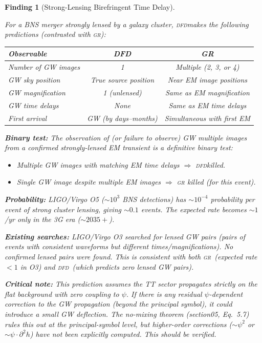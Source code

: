 \documentclass[11pt]{article}
\newtheorem{finding}{Finding}
\newcommand{\DFD}{\textsc{dfd}}
\newcommand{\GR}{\textsc{gr}}
\begin{document}
\begin{finding}[Strong-Lensing Birefringent Time Delay]\label{find:strong-lens}

For a BNS merger strongly lensed by a galaxy cluster, \DFD makes the
following predictions (contrasted with \GR):

\begin{table}[H]
\centering
\begin{tabular}{lcc}
\toprule
Observable & DFD & GR \\
\midrule
Number of GW images & 1 & Multiple (2, 3, or 4) \\
GW sky position & True source position & Near EM image positions \\
GW magnification & 1 (unlensed) & Same as EM magnification \\
GW time delays & None & Same as EM time delays \\
First arrival & GW (by days--months) & Simultaneous with first EM \\
\bottomrule
\end{tabular}
\end{table}

\textbf{Binary test:} The observation of (or failure to observe) GW
multiple images from a confirmed strongly-lensed EM transient is a
definitive binary test:
\begin{itemize}[nosep]
\item Multiple GW images with matching EM time delays $\Rightarrow$
  \DFD killed.
\item Single GW image despite multiple EM images $\Rightarrow$ \GR
  killed (for this event).
\end{itemize}

\textbf{Probability:} LIGO/Virgo O5 ($\sim 10^3$ BNS detections)
has $\sim 10^{-4}$ probability per event of strong cluster lensing,
giving $\sim 0.1$ events. The expected rate becomes $\sim 1$/yr
only in the 3G era ($\sim 2035+$).

\textbf{Existing searches:} LIGO/Virgo O3 searched for lensed GW
pairs (pairs of events with consistent waveforms but different
times/magnifications). No confirmed lensed pairs were found. This
is consistent with both \GR\ (expected rate $< 1$ in O3) and \DFD\
(which predicts zero lensed GW pairs).

\textbf{Critical note:} This prediction assumes the TT sector
propagates strictly on the flat background with zero coupling to
$\psi$. If there is any residual $\psi$-dependent correction to
the GW propagation (beyond the principal symbol), it could introduce
a small GW deflection. The no-mixing theorem (section05, Eq.~5.7)
rules this out at the principal-symbol level, but higher-order
corrections ($\sim \psi^2$ or $\sim \psi\cdot\partial^2 h$) have
not been explicitly computed. This should be verified.
\end{finding}
\end{document}
